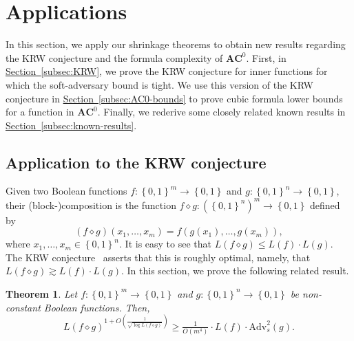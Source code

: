 \documentclass[11pt]{article}
\numberwithin{equation}{section}
\newtheorem{theorem}{Theorem}[section]
\theoremstyle{definition}
\theoremstyle{plain}
\newcommand{\expref}[2]{\hyperref[#2]{#1~\ref{#2}}}
\theoremstyle{definition}\newtheorem{notation}[theorem]{Notation}\theoremstyle{plain}
\newcommand{\B}{\left\{ 0,1 \right \}}
\newcommand{\ACz}{\boldsymbol{AC}^{0}}
\newcommand{\Am}{\mathrm{Adv}_{s}}
\renewcommand{\d}{\diamond}
\theoremstyle{definition}
\theoremstyle{plain}
\begin{document}
\section{\label{sec:applications}Applications}

In this section, we apply our shrinkage theorems to obtain new results
regarding the KRW conjecture and the formula complexity of $\ACz$.
First, in \expref{Section}{subsec:KRW}, we prove the KRW conjecture for inner
functions for which the soft-adversary bound is tight. We use this
version of the KRW conjecture in \expref{Section}{subsec:AC0-bounds} to prove
cubic formula lower bounds for a function in $\ACz$. Finally, we
rederive some closely related known results in \expref{Section}{subsec:known-results}.

\subsection{\label{subsec:KRW}Application to the KRW conjecture}

Given two Boolean functions $f\colon\B^{m}\to\B$ and $g\colon\B^{n}\to\B$,
their (block-)\-composition is the function $f\d g\colon\left(\B^{n}\right)^{m}\to\B$
defined by 
\[
(f\d g)(x_{1},\ldots,x_{m})=f\left(g(x_{1}),\ldots,g(x_{m})\right),
\]
where $x_{1},\ldots,x_{m}\in\B^{n}$. It is easy to see that $L(f\d g)\le L(f)\cdot L(g)$.
The KRW conjecture~\cite{KRW95} asserts that this is roughly optimal,
namely, that $L(f\d g)\gtrsim L(f)\cdot L(g)$. In this section,
we prove the following related result. 
\begin{theorem}
\label{thm:composition-theorem}Let $f\colon\B^{m}\to\B$ and $g\colon\B^{n}\to\B$
be non-constant Boolean functions. Then, 
\[
L\left(f\d g\right)^{1+O\left(\frac{1}{\sqrt{\log L(f\d g)}}\right)}\geq\tfrac{1}{O(m^{4})}\cdot L(f)\cdot\Am^{2}(g).
\]
\end{theorem}
%
%
%
%
%
%
%
%
%
%
%
%
%
\end{document}
